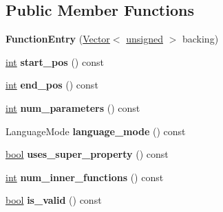 \subsection*{Public Member Functions}
\begin{DoxyCompactItemize}
\item 
\mbox{\label{classv8_1_1internal_1_1FunctionEntry_a99f26d745fa297ed2eaeda2d13f14e82}} 
{\bfseries Function\+Entry} (\mbox{\hyperlink{classv8_1_1internal_1_1Vector}{Vector}}$<$ \mbox{\hyperlink{classunsigned}{unsigned}} $>$ backing)
\item 
\mbox{\label{classv8_1_1internal_1_1FunctionEntry_a3f1f4ece35a1bc985b970c29bc3e774f}} 
\mbox{\hyperlink{classint}{int}} {\bfseries start\+\_\+pos} () const
\item 
\mbox{\label{classv8_1_1internal_1_1FunctionEntry_a5fc2d560cb80363cd7087e41e5f45f64}} 
\mbox{\hyperlink{classint}{int}} {\bfseries end\+\_\+pos} () const
\item 
\mbox{\label{classv8_1_1internal_1_1FunctionEntry_ab7f94e12ee172cf906ad34054a35b3af}} 
\mbox{\hyperlink{classint}{int}} {\bfseries num\+\_\+parameters} () const
\item 
\mbox{\label{classv8_1_1internal_1_1FunctionEntry_a9babe11558d096c0769f141aa43c5ef9}} 
Language\+Mode {\bfseries language\+\_\+mode} () const
\item 
\mbox{\label{classv8_1_1internal_1_1FunctionEntry_a0f8f957278eb9d1c5b9186794674984f}} 
\mbox{\hyperlink{classbool}{bool}} {\bfseries uses\+\_\+super\+\_\+property} () const
\item 
\mbox{\label{classv8_1_1internal_1_1FunctionEntry_a11b489f2c18663f9a577841520c616bf}} 
\mbox{\hyperlink{classint}{int}} {\bfseries num\+\_\+inner\+\_\+functions} () const
\item 
\mbox{\label{classv8_1_1internal_1_1FunctionEntry_aa67883224d05009807744a892b21f7a1}} 
\mbox{\hyperlink{classbool}{bool}} {\bfseries is\+\_\+valid} () const
\end{DoxyCompactItemize}
